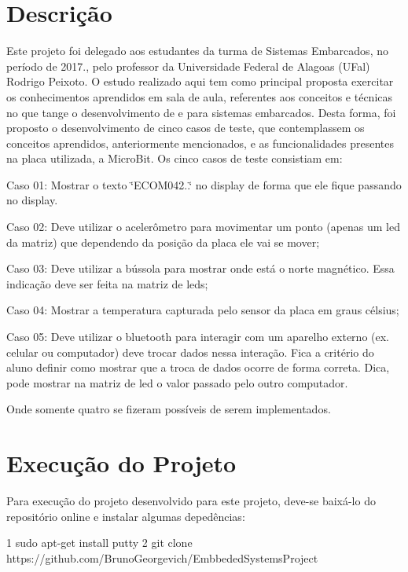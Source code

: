 \hypertarget{index_intro_sec}{}\section{Descrição}\label{index_intro_sec}
Este projeto foi delegado aos estudantes da turma de Sistemas Embarcados, no período de 2017., pelo professor da Universidade Federal de Alagoas (U\+Fal) Rodrigo Peixoto. O estudo realizado aqui tem como principal proposta exercitar os conhecimentos aprendidos em sala de aula, referentes aos conceitos e técnicas no que tange o desenvolvimento de e para sistemas embarcados. Desta forma, foi proposto o desenvolvimento de cinco casos de teste, que contemplassem os conceitos aprendidos, anteriormente mencionados, e as funcionalidades presentes na placa utilizada, a Micro\+Bit. Os cinco casos de teste consistiam em\+:
\begin{DoxyItemize}
\item Caso 01\+: Mostrar o texto \char`\"{}\+E\+C\+O\+M042..\char`\"{} no display de forma que ele fique passando no display.
\item Caso 02\+: Deve utilizar o acelerômetro para movimentar um ponto (apenas um led da matriz) que dependendo da posição da placa ele vai se mover;
\item Caso 03\+: Deve utilizar a bússola para mostrar onde está o norte magnético. Essa indicação deve ser feita na matriz de leds;
\item Caso 04\+: Mostrar a temperatura capturada pelo sensor da placa em graus célsius;
\item Caso 05\+: Deve utilizar o bluetooth para interagir com um aparelho externo (ex. celular ou computador) deve trocar dados nessa interação. Fica a critério do aluno definir como mostrar que a troca de dados ocorre de forma correta. Dica, pode mostrar na matriz de led o valor passado pelo outro computador.
\end{DoxyItemize}

Onde somente quatro se fizeram possíveis de serem implementados.\hypertarget{index_install_sec}{}\section{Execução do Projeto}\label{index_install_sec}
Para execução do projeto desenvolvido para este projeto, deve-\/se baixá-\/lo do repositório online e instalar algumas depedências\+: 
\begin{DoxyCode}
1 sudo apt-get install putty
2 git clone https://github.com/BrunoGeorgevich/EmbbededSystemsProject
\end{DoxyCode}


